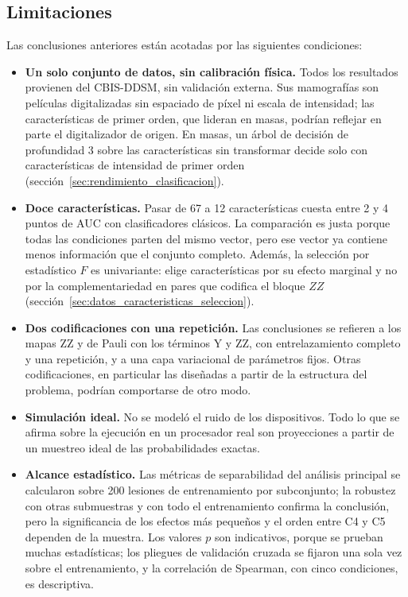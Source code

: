 
\subsection{Limitaciones}
\label{sec:limitaciones_conclusiones}

Las conclusiones anteriores están acotadas por las siguientes condiciones:

\begin{itemize}
  \item \textbf{Un solo conjunto de datos, sin calibración física.} Todos los resultados provienen del
  CBIS-DDSM, sin validación externa. Sus mamografías son películas digitalizadas sin espaciado de píxel
  ni escala de intensidad; las características de primer orden, que lideran en masas, podrían reflejar
  en parte el digitalizador de origen. En masas, un árbol de decisión de profundidad 3 sobre las
  características sin transformar decide solo con características de intensidad de primer orden
  (sección~\ref{sec:rendimiento_clasificacion}).
  \item \textbf{Doce características.} Pasar de 67 a 12 características cuesta entre 2 y 4 puntos de AUC
  con clasificadores clásicos. La comparación es justa porque todas las condiciones parten del mismo
  vector, pero ese vector ya contiene menos información que el conjunto completo. Además, la selección
  por estadístico $F$ es univariante: elige características por su efecto marginal y no por la
  complementariedad en pares que codifica el bloque $ZZ$ (sección~\ref{sec:datos_caracteristicas_seleccion}).
  \item \textbf{Dos codificaciones con una repetición.} Las conclusiones se refieren a los mapas ZZ y de
  Pauli con los términos Y y ZZ, con entrelazamiento completo y una repetición, y a una capa variacional
  de parámetros fijos. Otras codificaciones, en particular las diseñadas a partir de la estructura del
  problema, podrían comportarse de otro modo.
  \item \textbf{Simulación ideal.} No se modeló el ruido de los dispositivos. Todo lo que se afirma sobre
  la ejecución en un procesador real son proyecciones a partir de un muestreo ideal de las probabilidades
  exactas.
  \item \textbf{Alcance estadístico.} Las métricas de separabilidad del análisis principal se calcularon
  sobre 200 lesiones de entrenamiento por subconjunto; la robustez con otras submuestras y con todo el
  entrenamiento confirma la conclusión, pero la significancia de los efectos más pequeños y el orden entre
  C4 y C5 dependen de la muestra. Los valores $p$ son indicativos, porque se prueban muchas estadísticas;
  los pliegues de validación cruzada se fijaron una sola vez sobre el entrenamiento, y la correlación de
  Spearman, con cinco condiciones, es descriptiva.
\end{itemize}
